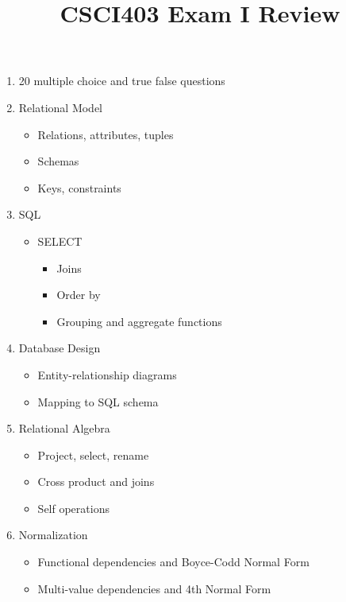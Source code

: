 \documentclass[12pt]{article}
\begin{document}
\title{CSCI403 Exam I Review}
\maketitle

	\begin{enumerate}
		\item
			20 multiple choice and true false questions
		\item
			Relational Model
		\begin{itemize}
			\item
				Relations, attributes, tuples
			\item
				Schemas
			\item
				Keys, constraints
		\end{itemize}
		\item
			SQL
		\begin{itemize}
			\item
				SELECT
				\begin{itemize}
					\item
						Joins
					\item
						Order by
					\item
						Grouping and aggregate functions
				\end{itemize}
		\end{itemize}

		\item
			Database Design
		\begin{itemize}
			\item
				Entity-relationship diagrams
			\item
				Mapping to SQL schema
		\end{itemize}

		\item
			Relational Algebra
		\begin{itemize}
			\item
				Project, select, rename
			\item
				Cross product and joins
			\item
				Self operations
		\end{itemize}
		\item
			Normalization
		\begin{itemize}
			\item
				Functional dependencies and Boyce-Codd Normal Form
			\item
				Multi-value dependencies and 4th Normal Form
		\end{itemize}


\end{enumerate}
\end{document}

